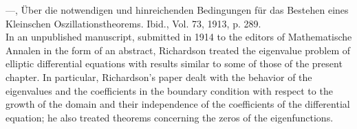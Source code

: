 ---, Über die notwendigen und hinreichenden Bedingungen für das Bestehen eines Kleinschen Oszillationstheorems. Ibid., Vol. 73, 1913, p. 289.\\[0.4em]
In an unpublished manuscript, submitted in 1914 to the editors of Mathematische Annalen in the form of an abstract, Richardson treated the eigenvalue problem of elliptic differential equations with results similar to some of those of the present chapter. In particular, Richardson's paper dealt with the behavior of the eigenvalues and the coefficients in the boundary condition with respect to the growth of the domain and their independence of the coefficients of the differential equation; he also treated theorems concerning the zeros of the eigenfunctions.
